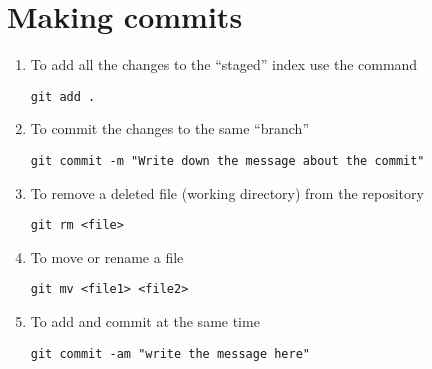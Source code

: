 \documentclass[paper=a4, fontsize=12pt]{scrartcl}
\begin{document}
\section*{Making commits}
\begin{enumerate}
\item To add all the changes to the ``staged'' index use the command
\begin{lstlisting}
git add .
\end{lstlisting}
\item To commit the changes to the same ``branch''
\begin{lstlisting}
git commit -m "Write down the message about the commit"
\end{lstlisting}
\item To remove a deleted file (working directory) from the repository
\begin{lstlisting}
git rm <file>
\end{lstlisting}
\item To move or rename a file
\begin{lstlisting}
git mv <file1> <file2>
\end{lstlisting}
\item To add and commit at the same time
\begin{lstlisting}
git commit -am "write the message here"
\end{lstlisting}
\end{enumerate}
\end{document}
